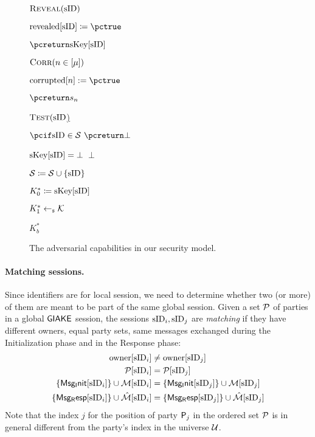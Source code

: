\begin{figure}[h!]
{{\begin{minipage}[t]{0.4\textwidth}
\underline{$\RevealO(\sID)$}
\begin{nicodemus}
	\item $\revealed[\sID] \coloneqq \pctrue$
	\item $\pcreturn \skeys[\sID]$	\\	
\end{nicodemus}

\underline{$\CorruptO(n \in [\maxusers])$}
\begin{nicodemus}
	\item $\corrupted[n] := \pctrue$
	\item $\pcreturn \ssk_n$\\
\end{nicodemus}

\underline{$\TestO(\sID$)}
\begin{nicodemus}
	\item $\pcif \sid\in\testSessions~ \pcreturn \bot$ 
	\item \pcif $\skeys[\sID] = \bot$~\pcreturn $\bot$
	\item $\testSessions \coloneqq \testSessions \cup \{\sid\}$
	\item $K_0^* \coloneqq \skeys[\sID]$
	\item $K_1^* \getsr \mathcal{K}$
	\item \pcreturn $K_b^*$
\end{nicodemus}
\end{minipage}
	}}
	\caption{The adversarial capabilities in our security model.}
	\label{fig:giake-adversary}
\end{figure}

\paragraph{Matching sessions.} Since identifiers are for local session, we need to determine whether two (or more) of them are meant to be part of the same global session. 
Given a set $\PartySet$ of parties in a global $\GIAKE$ session, the sessions $\sid_{i}, \sid_j$ are \textit{matching} if they have different owners, equal party sets, same messages exchanged during the Initialization phase and in the Response phase:
	\begin{align*}
		\owner[\sID_{i}] &\neq \owner[\sID_j] \\
		\GakeUSet[\sID_{i}] &= \GakeUSet[\sID_j]  \\
		\changehighlight{\{\GIniMes[\sID_{i}]\}} \cup \GIniMesSet[\sID_{i}] &= \changehighlight{\{\GIniMes[\sID_j]\}} \cup \GIniMesSet[\sID_j]   \\
		\changehighlight{\{\GResMes[\sID_{i}]\}} \cup \GResMesSet[\sID_{i}] &= \changehighlight{\{\GResMes[\sID_j]\}}\cup \GResMesSet[\sID_j]  
	\end{align*}
Note that the index $j$ for the position of party $\User[j]$ in the ordered set $\PartySet$ is in general different from the party's index in the universe $\Universe$.


